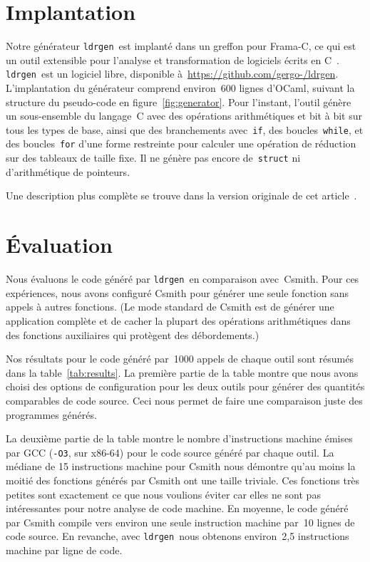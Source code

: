 \documentclass[a4paper]{easychair}
\newcommand\ldrgen{\texttt{ldrgen}}
\begin{document}
\section{Implantation}


Notre générateur \ldrgen\ est implanté dans un greffon pour Frama-C, ce qui
est un outil extensible pour l'analyse et transformation de logiciels écrits
en C~\cite{frama-c}. \ldrgen\ est un logiciel libre, disponible
à~\url{https://github.com/gergo-/ldrgen}. L'implantation du générateur
comprend environ~600 lignes d'OCaml, suivant la structure du pseudo-code en
figure~\ref{fig:generator}. Pour l'instant, l'outil génère un sous-ensemble
du langage~C avec des opérations arithmétiques et bit à bit sur tous les
types de base, ainsi que des branchements avec~\texttt{if}, des
boucles~\texttt{while}, et des boucles~\texttt{for} d'une forme restreinte
pour calculer une opération de réduction sur des tableaux de taille fixe. Il
ne génère pas encore de~\texttt{struct} ni d'arithmétique de pointeurs.


Une description plus complète se trouve dans la version originale de cet
article~\cite{ldrgen-2017}.


\section{Évaluation}

Nous évaluons le code généré par \ldrgen\ en comparaison avec~Csmith. Pour
ces expériences, nous avons configuré Csmith pour générer une seule
fonction sans appels à autres fonctions. (Le mode standard de Csmith est de
générer une application complète et de cacher la plupart des opérations
arithmétiques dans des fonctions auxiliaires qui protègent des
débordements.)

Nos résultats pour le code généré par~1000 appels de chaque outil sont
résumés dans la table~\ref{tab:results}. La première partie de la table
montre que nous avons choisi des options de configuration pour les deux
outils pour générer des quantités comparables de code source. Ceci nous
permet de faire une comparaison juste des programmes générés.

La deuxième partie de la table montre le nombre d'instructions machine
émises par GCC (\texttt{-O3}, sur x86-64) pour le code source généré par
chaque outil. La médiane de 15 instructions machine pour Csmith nous
démontre qu'au moins la moitié des fonctions générés par Csmith ont une
taille triviale. Ces fonctions très petites sont exactement ce que nous
voulions éviter car elles ne sont pas intéressantes pour notre analyse de
code machine. En moyenne, le code généré par Csmith compile vers environ une
seule instruction machine par~10 lignes de code source. En revanche, avec
\ldrgen\ nous obtenons environ~2,5 instructions machine par ligne de code.
\end{document}
